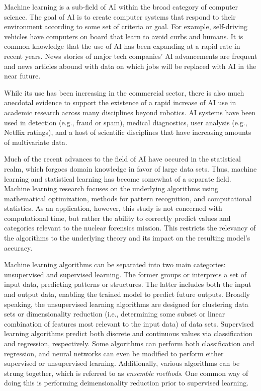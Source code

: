 Machine learning is a sub-field of \gls{AI} within the broad category of
computer science. The goal of \gls{AI} is to create computer systems that
respond to their environment according to some set of criteria or goal. For
example, self-driving vehicles have computers on board that learn to avoid
curbs and humans. It is common knowledge that the use of \gls{AI} has been
expanding at a rapid rate in recent years. News stories of major tech
companies' \gls{AI} advancements are frequent and news articles abound with
data on which jobs will be replaced with \gls{AI} in the near future. 

While its use has been increasing in the commercial sector, there is also much
anecdotal evidence to support the existence of a rapid increase of \gls{AI} use
in academic research across many disciplines beyond robotics. \gls{AI} systems
have been used in detection (e.g., fraud or spam), medical diagnostics, user
analysis (e.g., Netflix ratings), and a host of scientific disciplines that
have increasing amounts of multivariate data.

Much of the recent advances to the field of \gls{AI} have occured in the
statistical realm, which forgoes domain knowledge in favor of large data sets.
Thus, machine learning and statistical learning has become somewhat of a
separate field.  Machine
learning research focuses on the underlying algorithms using mathematical
optimization, methods for pattern recognition, and computational statistics.
As an application, however, this study is not concerned with computational
time, but rather the ability to correctly predict values and categories
relevant to the nuclear forensics mission. This restricts the relevancy of the
algorithms to the underlying theory and its impact on the resulting model's
accuracy. 

Machine learning algorithms can be separated into two main categories:
unsupervised and supervised learning.  The former groups or interprets a set of
input data, predicting patterns or structures. The latter includes both the
input and output data, enabling the trained model to predict future outputs.
Broadly speaking, the unsupervised learning algorithms are designed for
clustering data sets or dimensionality reduction (i.e., determining some subset
or linear combination of features most relevant to the input data) of data
sets.  Supervised learning algorithms predict both discrete and continuous
values via classification and regression, respectively. Some algorithms can
perform both classification and regression, and neural networks can even be
modified to perform either supervised or unsupervised learning. Additionally,
various algorithms can be strung together, which is referred to as \textit{ensemble
methods}. One common way of doing this is performing deimensionality reduction
prior to supervised learning. 

